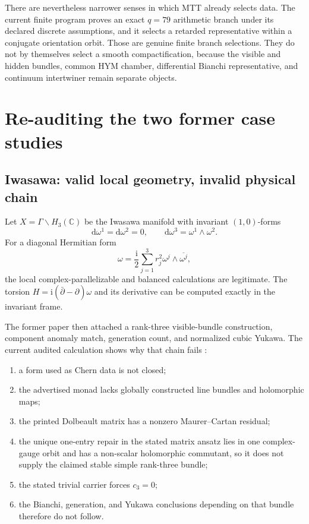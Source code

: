 \documentclass[11pt]{article}
\newcommand{\C}{\mathbb{C}}
\newcommand{\dd}{\mathrm{d}}
\numberwithin{equation}{section}
\theoremstyle{definition}
\theoremstyle{plain}
\theoremstyle{remark}
\begin{document}
There are nevertheless narrower senses in which MTT already selects data.
The current finite program proves an exact \(q=79\) arithmetic branch under
its declared discrete assumptions, and it selects a retarded representative
within a conjugate orientation orbit.  Those are genuine finite branch
selections.  They do not by themselves select a smooth compactification,
because the visible and hidden bundles, common HYM chamber, differential
Bianchi representative, and continuum intertwiner remain separate objects.

\section{Re-auditing the two former case studies}

\subsection{Iwasawa: valid local geometry, invalid physical chain}

Let \(X=\Gamma\backslash H_3(\C)\) be the Iwasawa manifold with invariant
\((1,0)\)-forms
\[
\dd\omega^1=\dd\omega^2=0,\qquad
\dd\omega^3=\omega^1\wedge\omega^2.
\]
For a diagonal Hermitian form
\[
\omega=\frac{\mathrm{i}}{2}
\sum_{j=1}^{3}r_j^2\omega^j\wedge\overline{\omega^j},
\]
the local complex-parallelizable and balanced calculations are legitimate.
The torsion \(H=\mathrm{i}(\bar\partial-\partial)\omega\) and its derivative
can be computed exactly in the invariant frame.

The former paper then attached a rank-three visible-bundle construction,
component anomaly match, generation count, and normalized cubic Yukawa.
The current audited calculation shows why that chain fails
\cite{NeroFluxAudit2026}:
\begin{enumerate}[leftmargin=2em]
\item a form used as Chern data is not closed;
\item the advertised monad lacks globally constructed line bundles and
      holomorphic maps;
\item the printed Dolbeault matrix has a nonzero Maurer--Cartan residual;
\item the unique one-entry repair in the stated matrix ansatz lies in one
      complex-gauge orbit and has a non-scalar holomorphic commutant, so it
      does not supply the claimed stable simple rank-three bundle;
\item the stated trivial carrier forces \(c_3=0\);
\item the Bianchi, generation, and Yukawa conclusions depending on that
      bundle therefore do not follow.
\end{enumerate}
\end{document}
